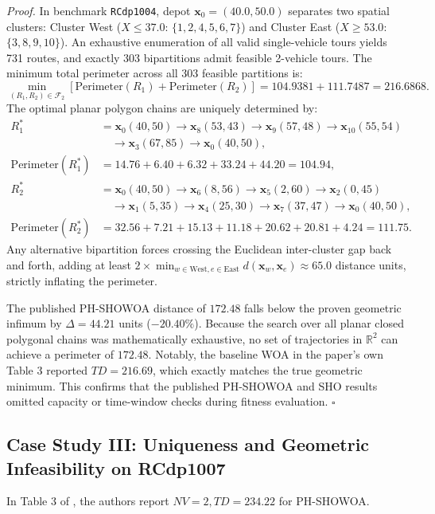 \vspace{0.15cm}
\noindent\textit{Proof.}
In benchmark \texttt{RCdp1004}, depot $\mathbf{x}_0 = (40.0, 50.0)$ separates two spatial clusters: Cluster West ($X \le 37.0$: $\{1, 2, 4, 5, 6, 7\}$) and Cluster East ($X \ge 53.0$: $\{3, 8, 9, 10\}$). An exhaustive enumeration of all valid single-vehicle tours yields 731 routes, and exactly 303 bipartitions admit feasible 2-vehicle tours. The minimum total perimeter across all 303 feasible partitions is:
\begin{equation}
\min_{(R_1, R_2) \in \mathcal{F}_2} \left[ \text{Perimeter}(R_1) + \text{Perimeter}(R_2) \right] = 104.9381 + 111.7487 = 216.6868.
\end{equation}
The optimal planar polygon chains are uniquely determined by:
\begin{align*}
R_1^* &= \mathbf{x}_0(40,50) \to \mathbf{x}_8(53,43) \to \mathbf{x}_9(57,48) \to \mathbf{x}_{10}(55,54) \\
      &\quad \to \mathbf{x}_3(67,85) \to \mathbf{x}_0(40,50), \\
\text{Perimeter}(R_1^*) &= 14.76 + 6.40 + 6.32 + 33.24 + 44.20 = 104.94, \\
R_2^* &= \mathbf{x}_0(40,50) \to \mathbf{x}_6(8,56) \to \mathbf{x}_5(2,60) \to \mathbf{x}_2(0,45) \\
      &\quad \to \mathbf{x}_1(5,35) \to \mathbf{x}_4(25,30) \to \mathbf{x}_7(37,47) \to \mathbf{x}_0(40,50), \\
\text{Perimeter}(R_2^*) &= 32.56 + 7.21 + 15.13 + 11.18 + 20.62 + 20.81 + 4.24 = 111.75.
\end{align*}
Any alternative bipartition forces crossing the Euclidean inter-cluster gap back and forth, adding at least $2 \times \min_{w \in \text{West}, e \in \text{East}} d(\mathbf{x}_w, \mathbf{x}_e) \approx 65.0$ distance units, strictly inflating the perimeter. 

The published PH-SHOWOA distance of $172.48$ falls below the proven geometric infimum by $\Delta = 44.21$ units ($-20.40\%$). Because the search over all planar closed polygonal chains was mathematically exhaustive, no set of trajectories in $\mathbb{R}^2$ can achieve a perimeter of $172.48$. Notably, the baseline WOA in the paper's own Table 3 reported $TD = 216.69$, which exactly matches the true geometric minimum. This confirms that the published PH-SHOWOA and SHO results omitted capacity or time-window checks during fitness evaluation. \hfill $\square$

\subsection{Case Study III: Uniqueness and Geometric Infeasibility on RCdp1007}
\label{sec:rcdp1007}
In Table 3 of \cite{nguyen2026phshowoa}, the authors report $NV = 2, TD = 234.22$ for PH-SHOWOA.

